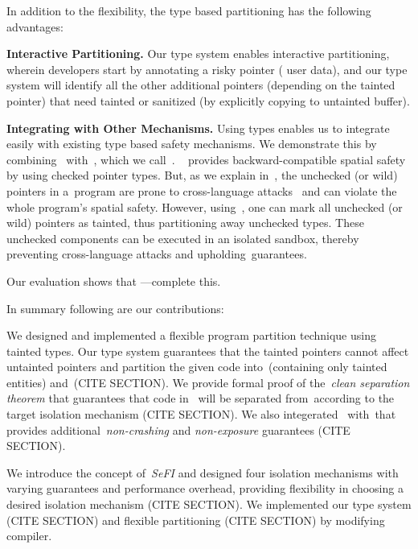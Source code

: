 In addition to the flexibility, the type based partitioning has the following advantages:

\noindent\textbf{Interactive Partitioning.} Our type system enables interactive partitioning, wherein developers start by annotating a risky pointer (\ie{} user data), and our type system will identify all the other additional pointers (depending on the tainted pointer) that need tainted or sanitized (\eg by explicitly copying to untainted buffer).

\noindent\textbf{Integrating with Other Mechanisms.} Using types enables us to integrate easily with existing type based safety mechanisms. We demonstrate this by combining~\systemname{} with~\checkedc, which we call~\ccflex.
\checkedc~\cite{Elliott2018} provides backward-compatible spatial safety by using checked pointer types. 
But, as we explain in~, the unchecked (or wild) pointers in a~\checkedc program are prone to cross-language attacks~\cite{mergendahl2022cross} and can violate the whole program's spatial safety.
However, using~\systemname{}, one can mark all unchecked (or wild) pointers as tainted, thus partitioning away unchecked types.
These unchecked components can be executed in an isolated sandbox, thereby preventing cross-language attacks and upholding~\checkedc guarantees.

Our evaluation shows that ---complete this. 

In summary following are our contributions:

We designed and implemented a flexible program partition technique using tainted types.
Our type system guarantees that the tainted pointers cannot affect untainted pointers and partition the given code into~\ucregion (containing only tainted entities) and~\cregion (CITE SECTION).
We provide formal proof of the~\emph{clean separation theorem} that guarantees that code in ~\cregion will be separated from~\ucregion according to the target isolation mechanism (CITE SECTION).
We also integerated~\systemname{} with~\checkedc that provides additional~\emph{non-crashing} and \emph{non-exposure} guarantees (CITE SECTION).

We introduce the concept of~\emph{\acf{SeFI}} and designed four isolation mechanisms with varying guarantees and performance overhead, providing flexibility in choosing a desired isolation mechanism (CITE SECTION).
We implemented our type system (CITE SECTION) and flexible partitioning (CITE SECTION) by modifying~\clang{} compiler.

